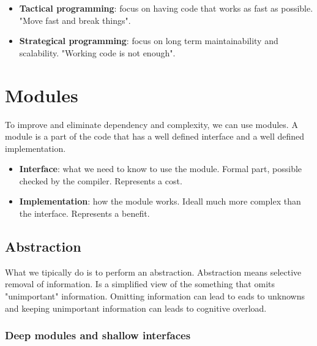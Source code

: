 \begin{itemize}
  \item \textbf{Tactical programming}: focus on having code that works as fast as possible. "Move fast and break things".
  \item \textbf{Strategical programming}: focus on long term maintainability and scalability. "Working code is not enough".
\end{itemize}

\section{Modules}

To improve and eliminate dependency and complexity, we can use modules. A module is a part of the code that has a well defined interface and a well defined implementation.

\begin{itemize}
  \item \textbf{Interface}: what we need to know to use the module. Formal part, possible checked by the compiler. Represents a cost.
  \item \textbf{Implementation}: how the module works. Ideall much more complex than the interface. Represents a benefit.
\end{itemize}

\subsection{Abstraction}

What we tipically do is to perform an abstraction. Abstraction means selective removal of information.
Is a simplified view of the something that omits "unimportant" information. Omitting information can lead to eads to unknowns and
keeping unimportant information can leads to cognitive overload.

\subsubsection{Deep modules and shallow interfaces}


